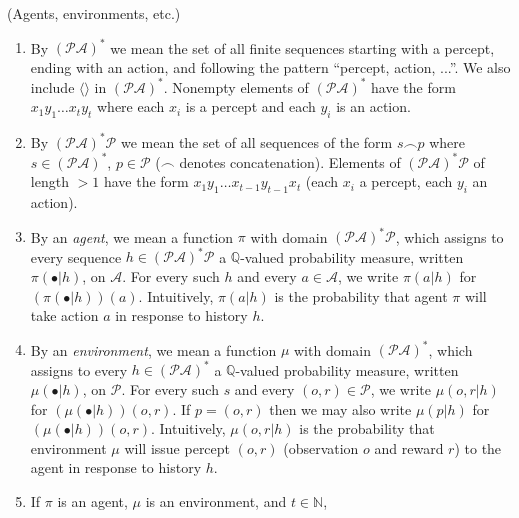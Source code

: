\documentclass[runningheads]{llncs}
\begin{document}
\begin{definition}
\label{omnibusdefn}
    (Agents, environments, etc.)
    \begin{enumerate}
        \item
        By $(\mathcal P\mathcal A)^*$ we mean the set of
        all finite sequences
        starting with a percept, ending with an action,
        and following the pattern ``percept, action, ...''.
        We also include $\langle\rangle$ in $(\mathcal P\mathcal A)^*$.
        Nonempty elements of $(\mathcal P\mathcal A)^*$ have the
        form $x_1y_1\ldots x_ty_t$ where each $x_i$ is a percept and
        each $y_i$ is an action.
        \item
        By $(\mathcal P\mathcal A)^* \mathcal P$
        we mean the set of all sequences of the form $s\frown p$ where
        $s\in (\mathcal P\mathcal A)^*$, $p\in\mathcal P$
        ($\frown$ denotes concatenation).
        Elements of $(\mathcal P\mathcal A)^* \mathcal P$
        of length $>1$ have the form
        $x_1y_1\ldots x_{t-1}y_{t-1}x_t$
        (each $x_i$ a percept, each $y_i$ an action).
        \item
        By an \emph{agent}, we mean a function $\pi$
        with domain $(\mathcal P\mathcal A)^* \mathcal P$,
        which assigns to every sequence
        $h\in (\mathcal P\mathcal A)^* \mathcal P$ a
        $\mathbb Q$-valued probability measure,
        written $\pi(\bullet|h)$, on $\mathcal A$.
        For every such $h$ and every $a\in\mathcal A$,
        we write $\pi(a|h)$ for $(\pi(\bullet|h))(a)$.
        Intuitively, $\pi(a|h)$ is the probability that agent $\pi$
        will take action $a$ in response to history $h$.
        \item
        By an \emph{environment}, we mean a function $\mu$
        with domain $(\mathcal P\mathcal A)^*$,
        which assigns to every
        $h\in (\mathcal P\mathcal A)^*$
        a $\mathbb Q$-valued probability measure,
        written $\mu(\bullet|h)$,
        on $\mathcal P$.
        For every such $s$ and every $(o,r)\in\mathcal P$,
        we write $\mu(o,r|h)$ for $(\mu(\bullet|h))(o,r)$.
        If $p=(o,r)$ then we may also write $\mu(p|h)$ for
        $(\mu(\bullet|h))(o,r)$.
        Intuitively, $\mu(o,r|h)$ is the probability that environment
        $\mu$ will issue percept $(o,r)$ (observation $o$ and reward $r$)
        to the agent in response to history $h$.
        \item
        If $\pi$ is an agent, $\mu$ is an environment, and $t\in\mathbb N$,

\end{enumerate}
\end{definition}
\end{document}
